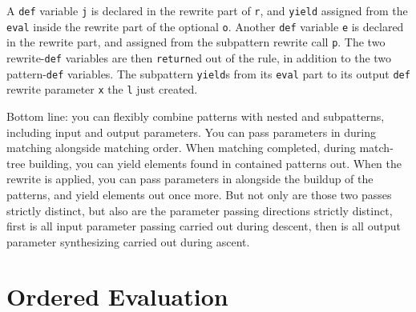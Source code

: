 A \texttt{def} variable \texttt{j} is declared in the rewrite part of \texttt{r}, and \texttt{yield} assigned from the \texttt{eval} inside the rewrite part of the optional \texttt{o}.
Another \texttt{def} variable \texttt{e} is declared in the rewrite part, and assigned from the subpattern rewrite call \texttt{p}.
The two rewrite-\texttt{def} variables are then \texttt{return}ed out of the rule, in addition to the two pattern-\texttt{def} variables.
The subpattern \texttt{yield}s from its \texttt{eval} part to its output \texttt{def} rewrite parameter \texttt{x} the \texttt{l} just created.

Bottom line: you can flexibly combine patterns with nested and subpatterns, including input and output parameters.
You can pass parameters in during matching alongside matching order. When matching completed, during match-tree building, you can yield elements found in contained patterns out. 
When the rewrite is applied, you can pass parameters in alongside the buildup of the patterns, and yield elements out once more.
But not only are those two passes strictly distinct, but also are the parameter passing directions strictly distinct, first is all input parameter passing carried out during descent, then is all output parameter synthesizing carried out during ascent.


\section{Ordered Evaluation} \label{sec:localvarorderedevalyield}

